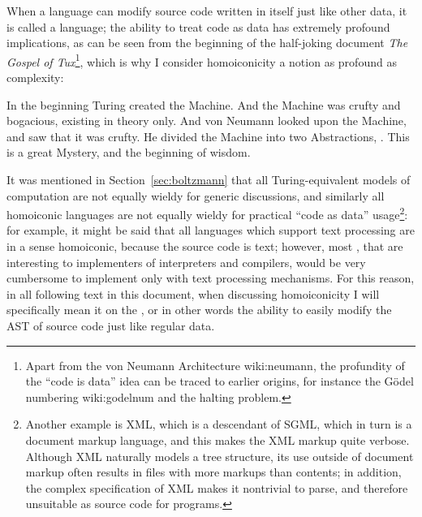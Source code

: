 When a language can modify source code written in itself just like other
data, it is called a  language;
the ability to treat code as data has extremely profound implications,
as can be seen from the beginning of the half-joking document \emph{The
Gospel of Tux}\footnote{Apart from the von Neumann Architecture\cupercite%
{wiki:neumann}, the profundity of the ``code is data'' idea can be
traced to earlier origins, for instance the Gödel numbering\cupercite%
{wiki:godelnum} and the halting problem.}, which
is why I consider homoiconicity a notion as profound as complexity:
\begin{quoting}
	In the beginning Turing created the Machine.  And the Machine was crufty
	and bogacious, existing in theory only.  And von Neumann looked upon
	the Machine, and saw that it was crufty.  He divided the Machine into
	two Abstractions, .  This is a great Mystery, and the beginning of wisdom.
\end{quoting}
It was mentioned in Section~\ref{sec:boltzmann} that all Turing-equivalent
models of computation are not equally wieldy for generic discussions, and
similarly all homoiconic languages are not equally wieldy for practical ``code
as data'' usage\footnote{Another example is XML, which is a descendant of SGML,
which in turn is a document markup language, and this makes the XML markup quite
verbose.  Although XML naturally models a tree structure, its use outside of
document markup often results in files with more markups than contents; in
addition, the complex specification of XML makes it nontrivial to parse, and
therefore unsuitable as source code for programs.}: for example, it might be
said that all languages which support text processing are in a sense homoiconic,
because the source code is text; however, most ,
that are interesting to implementers of interpreters and compilers, would be
very cumbersome to implement only with text processing mechanisms.  For this
reason, in all following text in this document, when discussing homoiconicity
I will specifically mean it on the , or in other words
the ability to easily modify the AST of source code just like regular data.

